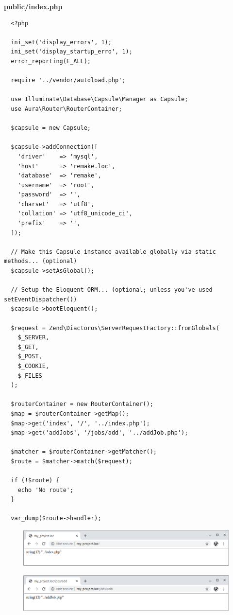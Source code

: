\documentclass{article}
\begin{document}
\textbf{public/index.php}
\begin{verbatim}
  <?php

  ini_set('display_errors', 1);
  ini_set('display_startup_erro', 1);
  error_reporting(E_ALL);

  require '../vendor/autoload.php';

  use Illuminate\Database\Capsule\Manager as Capsule;
  use Aura\Router\RouterContainer;

  $capsule = new Capsule;

  $capsule->addConnection([
    'driver'    => 'mysql',
    'host'      => 'remake.loc',
    'database'  => 'remake',
    'username'  => 'root',
    'password'  => '',
    'charset'   => 'utf8',
    'collation' => 'utf8_unicode_ci',
    'prefix'    => '',
  ]);

  // Make this Capsule instance available globally via static methods... (optional)
  $capsule->setAsGlobal();

  // Setup the Eloquent ORM... (optional; unless you've used setEventDispatcher())
  $capsule->bootEloquent();

  $request = Zend\Diactoros\ServerRequestFactory::fromGlobals(
    $_SERVER,
    $_GET,
    $_POST,
    $_COOKIE,
    $_FILES
  );

  $routerContainer = new RouterContainer();
  $map = $routerContainer->getMap();
  $map->get('index', '/', '../index.php');
  $map->get('addJobs', '/jobs/add', '../addJob.php');

  $matcher = $routerContainer->getMatcher();
  $route = $matcher->match($request);

  if (!$route) {
    echo 'No route';
  }

  var_dump($route->handler);
\end{verbatim}

\begin{figure}[h!]
  \centering
  \includegraphics[scale=0.5]{./Pictures/120_route.png}
\end{figure}

\begin{figure}[h!]
  \centering
  \includegraphics[scale=0.5]{./Pictures/121_route.png}
\end{figure}
\end{document}
